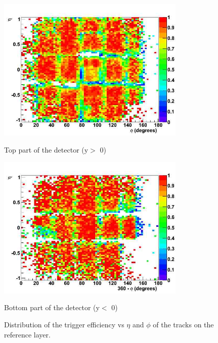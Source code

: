 \begin{figure}[hbtp]

 \begin{minipage}{1.0\textwidth}
  \begin{center}
 
     \includegraphics[width=0.8\textwidth]{eff_eta_phi_top_08}
       \caption{Top part of the detector (y$ > $ 0) }
  \end{center}
  \end{minipage}

     \begin{minipage}{1.0\textwidth}
     \begin{center}
      \includegraphics[width=0.8\textwidth]{eff_eta_phi_bot_08}
       \caption{Bottom part of the detector (y$ < $ 0) }
  \end{center}
  \end{minipage}
     
      \caption{Distribution of the trigger efficiency vs $\eta$ and $\phi$ of the tracks on the reference layer.}
      \label{fig:eff_eta_phi_08}

\end{figure}




